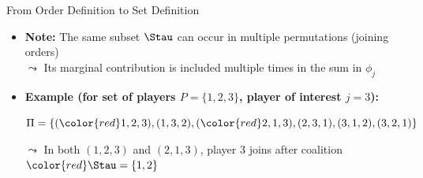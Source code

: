 \documentclass[11pt,compress,t,notes=noshow, aspectratio=169, xcolor=table]{beamer}
\begin{document}
\begin{frame}{From Order Definition to Set Definition}

\begin{itemize}
\item<1-> \textbf{Note:} The same subset \(\Stau\) can occur in multiple permutations (joining orders)\\
\(\leadsto\) Its marginal contribution is included multiple times in the sum in $\phi_j$

\item<1-> \textbf{Example (for set of players \(P = \{1,2,3\}\), player of interest \(j = 3\)):}

\smallskip

\(\Pi = \{({\color{red}1,2},3), (1,3,2), ({\color{red}2,1},3), (2,3,1), (3,1,2), (3,2,1)\}\)

\smallskip

\(\leadsto\) In both \((1,2,3)\) and \((2,1,3)\), player 3 joins after coalition \({\color{red} \Stau = \{1,2\}}\)


\end{itemize}
\end{frame}
\end{document}
